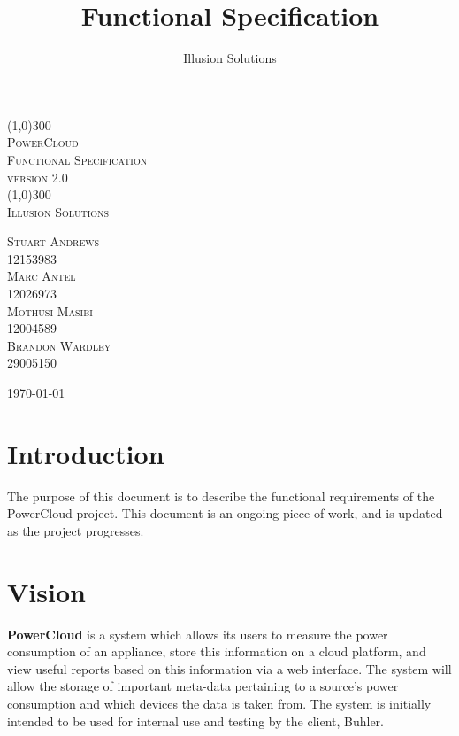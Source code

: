 \documentclass{article}
\title{
	Functional Specification
}
\author{Illusion Solutions}
\begin{document}
	
	\begin{titlepage}
		\begin{center}
			\line(1,0){300} \\
			[0.1cm]
			\textsc{\Huge
				PowerCloud\\
				Functional Specification
			} \\
			\textsc{\large version 2.0}\\
			[0.1cm]
			\line(1,0){300} \\
			[2.0cm]
			\textsc{\Large
				Illusion Solutions
			} \\
			[3.5cm]
			
		\end{center}
		\begin{flushright}
			\textsc{\Large
				Stuart Andrews\\ 
				12153983\\
				Marc Antel\\
				12026973\\
				Mothusi Masibi\\
				12004589\\
				Brandon Wardley\\
				29005150\\
				[4.0cm]
			}
		\end{flushright}
		\begin{center}
			\today
		\end{center}
	\end{titlepage}
	
	\newpage
	\restoregeometry
	\tableofcontents
	\thispagestyle{empty}
	
	\newpage
	
	\section{Introduction}
	
	The purpose of this document is to describe the functional 
	requirements of the PowerCloud project. This document is an ongoing 
	piece of work, and is updated as the project progresses.
	\section{Vision}
	\textbf{PowerCloud} is a system which allows its users to measure the power consumption of an appliance, store this 
	information on a cloud platform, and view useful reports based on this information via a web interface. The system will 
	allow the storage of important meta-data pertaining to a source's power consumption and which devices the data is taken 
	from. The system is initially intended to be used for internal use and testing by the client, Buhler.\\
	
\end{document}
